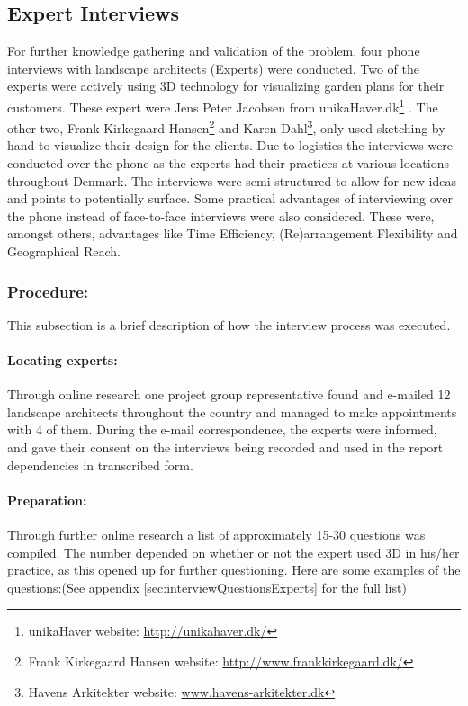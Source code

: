 \subsection{Expert Interviews}\label{sec:expertInterviews}
For further knowledge gathering and validation of the problem, four phone interviews with landscape architects (Experts) were conducted. Two of the experts were actively using 3D technology for visualizing garden plans for their customers. These expert were Jens Peter Jacobsen from unikaHaver.dk\footnote{unikaHaver website: \url{http://unikahaver.dk/}} . The other two, Frank Kirkegaard Hansen\footnote{Frank Kirkegaard Hansen website: \url{http://www.frankkirkegaard.dk/}} and Karen Dahl\footnote{Havens Arkitekter website: \url{www.havens-arkitekter.dk}}, only used sketching by hand to visualize their design for the clients. Due to logistics the interviews were conducted over the phone as the experts had their practices at various locations throughout Denmark. The interviews were semi-structured to allow for new ideas and points to potentially surface. Some practical advantages of interviewing over the phone instead of face-to-face interviews were also considered. These were, amongst others, advantages like Time Efficiency, (Re)arrangement Flexibility and Geographical Reach\cite{telephoneInterview}. 

\subsubsection{Procedure:}
This subsection is a brief description of how the interview process was executed.

\paragraph*{Locating experts:}
Through online research one project group representative found and e-mailed 12 landscape architects throughout the country and managed to make appointments with 4 of them. During the e-mail correspondence, the experts were informed, and gave their consent on the interviews being recorded and used in the report dependencies in transcribed form.

\paragraph*{Preparation:}
Through further online research a list of approximately 15-30 questions was compiled. The number depended on whether or not the expert used 3D in his/her practice, as this opened up for further questioning. Here are some examples of the questions:(See appendix \ref{sec:interviewQuestionsExperts} for the full list)

